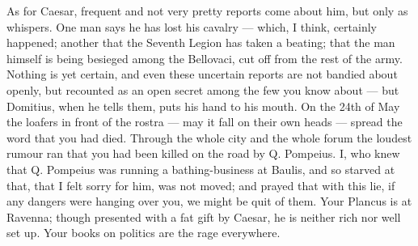  As for Caesar, frequent and not very pretty reports come about him, but only as whispers. One man says he has lost his cavalry --- which, I think, certainly happened; another that the Seventh Legion has taken a beating; that the man himself is being besieged among the Bellovaci, cut off from the rest of the army. Nothing is yet certain, and even these uncertain reports are not bandied about openly, but recounted as an open secret among the few you know about --- but Domitius, when he tells them, puts his hand to his mouth. On the 24th of May the loafers in front of the rostra --- may it fall on their own heads --- spread the word that you had died. Through the whole city and the whole forum the loudest rumour ran that you had been killed on the road by Q. Pompeius. I, who knew that Q. Pompeius was running a bathing-business at Baulis, and so starved at that, that I felt sorry for him, was not moved; and prayed that with this lie, if any dangers were hanging over you, we might be quit of them. Your Plancus is at Ravenna; though presented with a fat gift by Caesar, he is neither rich nor well set up. Your books on politics are the rage everywhere.
